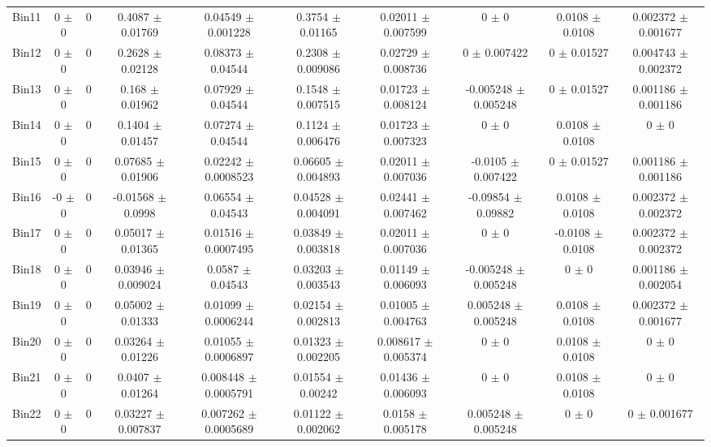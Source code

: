 \begin{tabular}{@{\extracolsep{4pt}}lccccccccc@{}}
     Bin11 & 0 $\pm$ 0 & 0 & 0.4087 $\pm$ 0.01769 & 0.04549 $\pm$ 0.001228 & 0.3754 $\pm$ 0.01165 & 0.02011 $\pm$ 0.007599 & 0 $\pm$ 0 & 0.0108 $\pm$ 0.0108 & 0.002372 $\pm$ 0.001677 \\ 
     Bin12 & 0 $\pm$ 0 & 0 & 0.2628 $\pm$ 0.02128 & 0.08373 $\pm$ 0.04544 & 0.2308 $\pm$ 0.009086 & 0.02729 $\pm$ 0.008736 & 0 $\pm$ 0.007422 & 0 $\pm$ 0.01527 & 0.004743 $\pm$ 0.002372 \\ 
     Bin13 & 0 $\pm$ 0 & 0 & 0.168 $\pm$ 0.01962 & 0.07929 $\pm$ 0.04544 & 0.1548 $\pm$ 0.007515 & 0.01723 $\pm$ 0.008124 & -0.005248 $\pm$ 0.005248 & 0 $\pm$ 0.01527 & 0.001186 $\pm$ 0.001186 \\ 
     Bin14 & 0 $\pm$ 0 & 0 & 0.1404 $\pm$ 0.01457 & 0.07274 $\pm$ 0.04544 & 0.1124 $\pm$ 0.006476 & 0.01723 $\pm$ 0.007323 & 0 $\pm$ 0 & 0.0108 $\pm$ 0.0108 & 0 $\pm$ 0 \\ 
     Bin15 & 0 $\pm$ 0 & 0 & 0.07685 $\pm$ 0.01906 & 0.02242 $\pm$ 0.0008523 & 0.06605 $\pm$ 0.004893 & 0.02011 $\pm$ 0.007036 & -0.0105 $\pm$ 0.007422 & 0 $\pm$ 0.01527 & 0.001186 $\pm$ 0.001186 \\ 
     Bin16 & -0 $\pm$ 0 & 0 & -0.01568 $\pm$ 0.0998 & 0.06554 $\pm$ 0.04543 & 0.04528 $\pm$ 0.004091 & 0.02441 $\pm$ 0.007462 & -0.09854 $\pm$ 0.09882 & 0.0108 $\pm$ 0.0108 & 0.002372 $\pm$ 0.002372 \\ 
     Bin17 & 0 $\pm$ 0 & 0 & 0.05017 $\pm$ 0.01365 & 0.01516 $\pm$ 0.0007495 & 0.03849 $\pm$ 0.003818 & 0.02011 $\pm$ 0.007036 & 0 $\pm$ 0 & -0.0108 $\pm$ 0.0108 & 0.002372 $\pm$ 0.002372 \\ 
     Bin18 & 0 $\pm$ 0 & 0 & 0.03946 $\pm$ 0.009024 & 0.0587 $\pm$ 0.04543 & 0.03203 $\pm$ 0.003543 & 0.01149 $\pm$ 0.006093 & -0.005248 $\pm$ 0.005248 & 0 $\pm$ 0 & 0.001186 $\pm$ 0.002054 \\ 
     Bin19 & 0 $\pm$ 0 & 0 & 0.05002 $\pm$ 0.01333 & 0.01099 $\pm$ 0.0006244 & 0.02154 $\pm$ 0.002813 & 0.01005 $\pm$ 0.004763 & 0.005248 $\pm$ 0.005248 & 0.0108 $\pm$ 0.0108 & 0.002372 $\pm$ 0.001677 \\ 
     Bin20 & 0 $\pm$ 0 & 0 & 0.03264 $\pm$ 0.01226 & 0.01055 $\pm$ 0.0006897 & 0.01323 $\pm$ 0.002205 & 0.008617 $\pm$ 0.005374 & 0 $\pm$ 0 & 0.0108 $\pm$ 0.0108 & 0 $\pm$ 0 \\ 
     Bin21 & 0 $\pm$ 0 & 0 & 0.0407 $\pm$ 0.01264 & 0.008448 $\pm$ 0.0005791 & 0.01554 $\pm$ 0.00242 & 0.01436 $\pm$ 0.006093 & 0 $\pm$ 0 & 0.0108 $\pm$ 0.0108 & 0 $\pm$ 0 \\ 
     Bin22 & 0 $\pm$ 0 & 0 & 0.03227 $\pm$ 0.007837 & 0.007262 $\pm$ 0.0005689 & 0.01122 $\pm$ 0.002062 & 0.0158 $\pm$ 0.005178 & 0.005248 $\pm$ 0.005248 & 0 $\pm$ 0 & 0 $\pm$ 0.001677 \\ 

\end{tabular}

